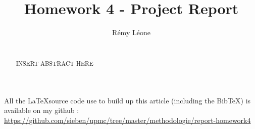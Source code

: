 \documentclass{sig-alternate}
\newcommand{\BibTeX}{{\sc Bib}\TeX}
\begin{document}
\title{Homework 4 - Project Report}


\author{
  \alignauthor
    Rémy Léone\\
    \\
}

\maketitle

\begin{abstract}
INSERT ABSTRACT HERE
\end{abstract}






\appendix
\makeatletter
\def\@seccntformat#1{Appendix~\csname the#1\endcsname:\quad}
\makeatother

All the \LaTeX source code use to build up this 
article (including the \BibTeX) is available on my github :
\href{https://github.com/sieben/upmc/tree/master/methodologie/report-homework4}{
https://github.com/sieben/upmc/tree/master/methodologie/report-homework4}

%
\end{document}

